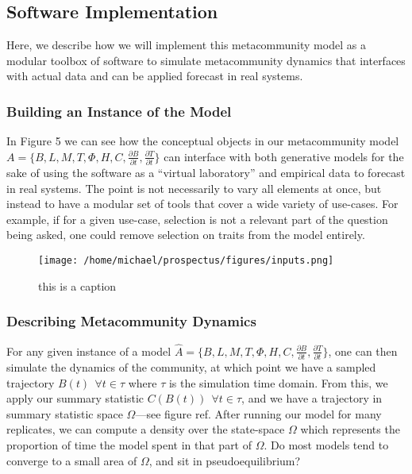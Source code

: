 \documentclass[]{article}
\begin{document}
\hypertarget{software-implementation}{%
\subsection{Software Implementation}\label{software-implementation}}

Here, we describe how we will implement this metacommunity model as a
modular toolbox of software to simulate metacommunity dynamics that
interfaces with actual data and can be applied forecast in real systems.

\hypertarget{interfacing-with-generative-models-and-data}{%
\subsubsection{Building an Instance of the Model}
\label{interfacing-with-generative-models-and-data}}
In Figure 5 we can see how the conceptual objects in our metacommunity
model
\(A = \{B, L, M, T, \Phi, H, C, \frac{\partial B}{\partial t}, \frac{\partial T}{\partial t} \}\)
can interface with both generative models for the sake of using the
software as a ``virtual laboratory'' \citep{volker_grimm} and
empirical data to forecast in real systems. The point is not necessarily
to vary all elements at once, but instead to have a modular set of tools
that cover a wide variety of use-cases. For example, if for a given use-case, selection is not a relevant part of the question being asked, one could remove selection on traits from the model entirely.

\begin{figure}[H]
\centering
\texttt{[image: /home/michael/prospectus/figures/inputs.png]}
\caption{this is a caption}
\end{figure}



\hypertarget{finding-the-pseudoequilibria-of-our-metacommunity-model}{%
\subsubsection{Describing Metacommunity Dynamics}
\label{finding-the-pseudoequilibria-of-our-metacommunity-model}}

For any given instance of a model $\hat{A} = \{B, L, M, T, \Phi, H, C, \frac{\partial B}{\partial t}, \frac{\partial T}{\partial t} \}$, one can then simulate the dynamics of the community, at which point we have a sampled trajectory $B(t) \ \ \forall t \in \tau$ where $\tau$ is the simulation time domain. From this, we apply our summary statistic $C(B(t)) \ \ \forall t \in \tau$, and we have a trajectory in summary statistic space $\Omega$---see figure ref. After running our model for many replicates, we can compute a density over the state-space $\Omega$ which represents the proportion of time the model spent in that part of $\Omega$. Do most models tend to converge to a small area of $\Omega$, and sit in pseudoequilibrium?
\end{document}

